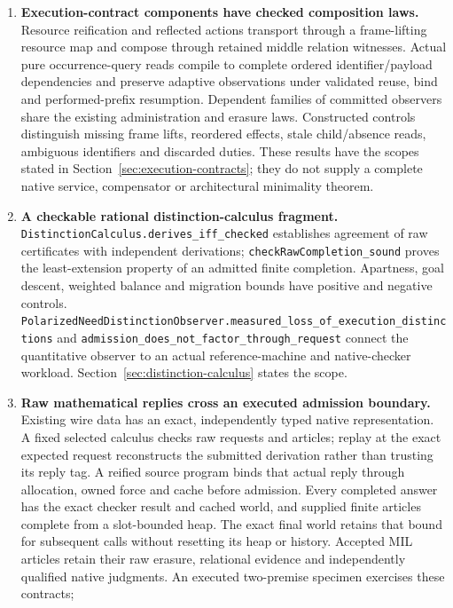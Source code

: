 \documentclass[11pt]{article}
\theoremstyle{definition}
\theoremstyle{remark}
\begin{document}
\begin{enumerate}
\item \textbf{Execution-contract components have checked composition laws.}
  Resource reification and reflected actions transport through a
  frame-lifting resource map and compose through retained middle relation
  witnesses. Actual pure occurrence-query reads compile to complete ordered
  identifier/payload dependencies and preserve adaptive observations under
  validated reuse, bind and performed-prefix resumption. Dependent families
  of committed observers share the existing administration and erasure
  laws. Constructed controls distinguish missing frame lifts, reordered
  effects, stale child/absence reads, ambiguous identifiers and discarded
  duties. These results have the scopes stated in
  Section~\ref{sec:execution-contracts}; they do not supply a complete native
  service, compensator or architectural minimality theorem.
\item \textbf{A checkable rational distinction-calculus fragment.}
  \nolinkurl{DistinctionCalculus.derives_iff_checked} establishes agreement
  of raw certificates with independent derivations;
  \nolinkurl{checkRawCompletion_sound} proves the least-extension property
  of an admitted finite completion. Apartness, goal descent, weighted
  balance and migration bounds have positive and negative controls.
  \nolinkurl{PolarizedNeedDistinctionObserver.measured_loss_of_execution_distinctions}
  and \nolinkurl{admission_does_not_factor_through_request} connect the
  quantitative observer to an actual reference-machine and native-checker
  workload. Section~\ref{sec:distinction-calculus} states the scope.
\item \textbf{Raw mathematical replies cross an executed admission boundary.}
  Existing wire data has an exact, independently typed native representation.
  A fixed selected calculus checks raw requests and articles; replay at the
  exact expected request reconstructs the submitted derivation rather than
  trusting its reply tag. A reified source program binds that actual reply
  through allocation, owned force and cache before admission. Every completed
  answer has the exact checker result and cached world, and supplied finite
  articles complete from a slot-bounded heap. The exact final world retains
  that bound for subsequent calls without resetting its heap or history.
  Accepted MIL articles retain their
  raw erasure, relational evidence and independently qualified native
  judgments. An executed two-premise specimen exercises these contracts;

\end{enumerate}
\end{document}
